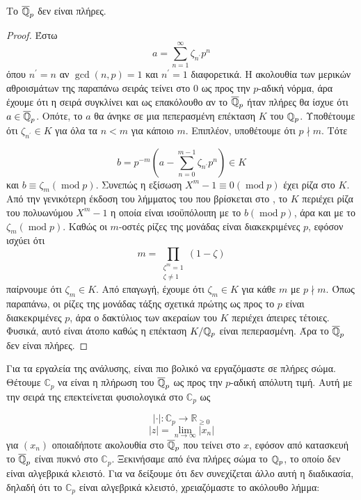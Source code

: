 \begin{prop}
	Το $\overline{\mathbb{Q}}_p$ δεν είναι πλήρες.
\end{prop}
\begin{proof} Έστω 
	$$a = \sum\limits_{n=1}^\infty \zeta_{n^\prime} p^n$$ όπου $n^\prime = n$ αν $\gcd(n,p)=1$ και $n^\prime = 1$ διαφορετικά. Η ακολουθία των μερικών αθροισμάτων της παραπάνω σειράς τείνει στο $0$ ως προς την $p$-αδική νόρμα, άρα έχουμε ότι η σειρά συγκλίνει και ως επακόλουθο αν το $\overline{\mathbb{Q}}_p$ ήταν πλήρες θα ίσχυε ότι $a \in \overline{\mathbb{Q}}_p$. Οπότε, το $a$ θα άνηκε σε μια πεπερασμένη επέκταση $K$ του $\mathbb{Q}_p$. Υποθέτουμε ότι $\zeta_{n^\prime} \in K$ για όλα τα $n < m$ για κάποιο $m$. Επιπλέον, υποθέτουμε ότι $p\nmid m$. Τότε

	$$b = p^{-m} \left( a - \sum\limits_{n=0}^{m-1} \zeta_{n^\prime} p^n\right) \in K$$ και $b\equiv \zeta_m (\operatorname{mod}p)$. 
	Συνεπώς η εξίσωση $X^m -1 \equiv 0 (\operatorname{mod}p)$ έχει ρίζα στο $K$. Από την γενικότερη έκδοση του λήμματος του  που βρίσκεται στο \cite{AM}, 
	το $K$ περιέχει ρίζα του πολυωνύμου $X^m-1$ η οποία είναι ισοϋπόλοιπη με το $b (\operatorname{mod}p)$, άρα και με το $\zeta_m (\operatorname{mod}p)$. Καθώς οι $m$-οστές ρίζες της μονάδας είναι διακεκριμένες  $p$, εφόσον ισχύει ότι 
	$$m = \prod\limits_{\substack{\zeta^m = 1 \\ \zeta \neq 1}}(1-\zeta)$$ παίρνουμε ότι $\zeta_m \in K$. Από επαγωγή, έχουμε ότι $\zeta_m \in K$ για κάθε $m$ με $p\nmid m$. Όπως παραπάνω, οι ρίζες της μονάδας τάξης σχετικά πρώτης ως προς το $p$ είναι διακεκριμένες  $p$, άρα ο δακτύλιος των ακεραίων του $K$ περιέχει άπειρες τέτοιες. Φυσικά, αυτό είναι άτοπο καθώς η επέκταση $K/\mathbb{Q}_p$ είναι πεπερασμένη. Άρα το $\overline{\mathbb{Q}}_p$ δεν είναι πλήρες.
\end{proof}


\noindent Για τα εργαλεία της ανάλυσης, είναι πιο βολικό να εργαζόμαστε σε πλήρες σώμα. 
Θέτουμε $\mathbb{C}_p$ να είναι η πλήρωση του $\overline{\mathbb{Q}}_p$ ως προς την $p$-αδική απόλυτη τιμή. 
Αυτή με την σειρά της επεκτείνεται φυσιολογικά στο $\mathbb{C}_p$ ως

$$|\cdot | : \mathbb{C}_p \longrightarrow \mathbb{R}_{\geq 0}$$
$$|z| = \lim_{n\rightarrow \infty} |x_n|$$ για $(x_n)$ οποιαδήποτε ακολουθία στο $\overline{\mathbb{Q}}_p$ που τείνει στο $x$, 
εφόσον από κατασκευή το $\overline{\mathbb{Q}}_p$ είναι πυκνό στο $\mathbb{C}_p$. Ξεκινήσαμε από ένα πλήρες σώμα το $\mathbb{Q}_p$, 
το οποίο δεν είναι αλγεβρικά κλειστό. Για να δείξουμε ότι δεν συνεχίζεται άλλο αυτή η διαδικασία, δηλαδή 
ότι το $\mathbb{C}_p$ είναι αλγεβρικά κλειστό, χρειαζόμαστε το ακόλουθο λήμμα:

